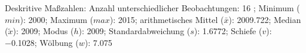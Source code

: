 				\label{tableValues:mres022b}
				\vspace*{-\baselineskip}
                    \begin{noten}
                	    \note{} Deskritive Maßzahlen:
                	    Anzahl unterschiedlicher Beobachtungen: 16%
                	    ; 
                	      Minimum ($min$): 2000; 
                	      Maximum ($max$): 2015; 
                	      arithmetisches Mittel ($\bar{x}$): \num[round-mode=places,round-precision=2]{2009,722}; 
                	      Median ($\tilde{x}$): 2009; 
                	      Modus ($h$): 2009; 
                	      Standardabweichung ($s$): \num[round-mode=places,round-precision=2]{1,6772}; 
                	      Schiefe ($v$): \num[round-mode=places,round-precision=2]{-0,1028}; 
                	      Wölbung ($w$): \num[round-mode=places,round-precision=2]{7,075}
                     \end{noten}


